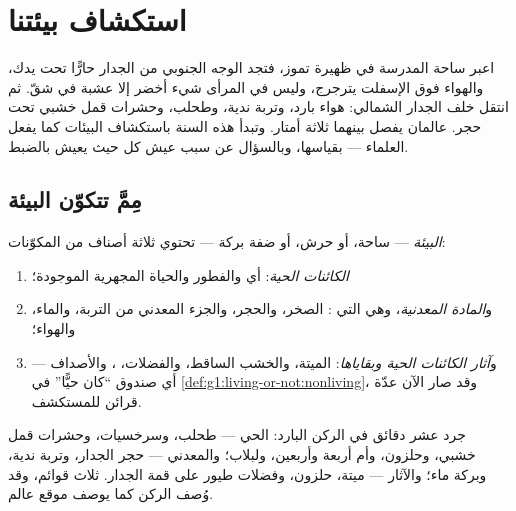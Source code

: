 \chapter{استكشاف بيئتنا}\label{ch:g6:exploring-our-environment}

اعبر ساحة المدرسة في ظهيرة تموز، فتجد الوجه الجنوبي من الجدار
حارًّا تحت يدك، والهواء فوق الإسفلت يترجرج، وليس في المرأى شيء أخضر
إلا عشبة في شقّ. ثم انتقل خلف الجدار الشمالي: هواء بارد، وتربة
ندية، وطحلب، وحشرات قمل خشبي تحت حجر. عالمان يفصل بينهما ثلاثة
أمتار. وتبدأ هذه السنة باستكشاف البيئات كما يفعل العلماء ---
بقياسها، وبالسؤال عن سبب عيش كل  حيث يعيش بالضبط.

\section{مِمَّ تتكوّن البيئة}

\begin{definition}\label{def:g6:exploring-our-environment:components}
\emph{البيئة} --- ساحة، أو حرش، أو ضفة بركة --- تحتوي
ثلاثة أصناف من المكوّنات:
\begin{enumerate}
  \item \emph{الكائنات الحية}: أي 
         والفطور والحياة المجهرية الموجودة؛
  \item و\emph{المادة المعدنية}، وهي التي : الصخر، والحجر، والجزء المعدني من التربة،
        والماء، والهواء؛
  \item و\emph{آثار الكائنات الحية وبقاياها}:  الميتة،
        والخشب الساقط، والفضلات، ، والأصداف --- أي صندوق
        ``كان حيًّا'' في \cref{def:g1:living-or-not:nonliving}،
        وقد صار الآن عدّة قرائن للمستكشف.
\end{enumerate}
\end{definition}

\begin{example}\label{ex:g6:exploring-our-environment:inventory}
جرد عشر دقائق في الركن البارد: الحي --- طحلب، وسرخسيات، وحشرات قمل
خشبي، وحلزون، وأم أربعة وأربعين، ولبلاب؛ والمعدني --- حجر الجدار،
وتربة ندية، وبركة ماء؛ والآثار ---  ميتة،  حلزون، وفضلات
طيور على قمة الجدار. ثلاث قوائم، وقد وُصف الركن كما يوصف موقع
عالم.
\end{example}


